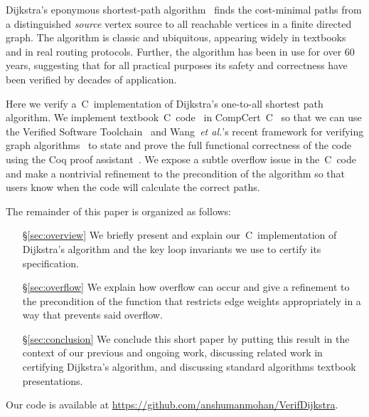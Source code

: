Dijkstra's eponymous shortest-path algorithm~\cite{DBLP:journals/nm/Dijkstra59} finds
the cost-minimal paths from a distinguished \emph{source} vertex
source to all reachable vertices in a finite directed graph.
The algorithm is classic and ubiquitous, appearing widely in textbooks~\cite{clrs}
and in real routing protocols. Further, the algorithm has been in
use for over $60$ years, suggesting that for all practical purposes
its safety and correctness have been verified by decades of application.


Here we verify a~C~implementation of Dijkstra's one-to-all shortest path algorithm.
We implement textbook~C~code~\cite{clrs} in CompCert~C~\cite{leroy:compcert} so that
we can use the Verified Software Toolchain~\cite{appel:programlogics} and
Wang~\emph{et al.}'s recent framework for verifying graph algorithms~\cite{DBLP:journals/pacmpl/WangCMH19} to state and prove the full functional
correctness of the code using the Coq proof assistant~\cite{coq}.
We expose a subtle overflow issue in the~C~code and make a nontrivial refinement to the precondition of the algorithm so that users know when the code will calculate the correct paths.

The remainder of this paper is organized as follows:
\begin{itemize}
    \item[\S\ref{sec:overview}] We briefly present and explain
    our~C~implementation of Dijkstra's algorithm and the key loop invariants
    we use to certify its specification.
    \item[\S\ref{sec:overflow}] We explain how overflow can occur and give a
    refinement to the precondition of the function that restricts edge weights
    appropriately in a way that prevents said overflow.
    \item[\S\ref{sec:conclusion}] We conclude this short paper by putting this result in the context of our
    previous and ongoing work, discussing related work in certifying Dijkstra's algorithm, and discussing standard algorithms textbook presentations.
\end{itemize} 

Our code is available at \url{https://github.com/anshumanmohan/VerifDijkstra}.
